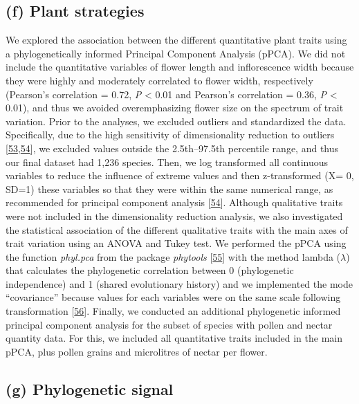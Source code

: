 \documentclass[
  12pt,
  a4paper,
]{article}
\begin{document}
\hypertarget{f-plant-strategies}{%
\subsection{(f) Plant strategies}\label{f-plant-strategies}}

We explored the association between the different quantitative plant traits using a phylogenetically informed Principal Component Analysis (pPCA). We did not include the quantitative variables of flower length and inflorescence width because they were highly and moderately correlated to flower width, respectively (Pearson's correlation = 0.72, \emph{P} \textless{} 0.01 and Pearson's correlation = 0.36, \emph{P} \textless{} 0.01), and thus we avoided overemphasizing flower size on the spectrum of trait variation. Prior to the analyses, we excluded outliers and standardized the data. Specifically, due to the high sensitivity of dimensionality reduction to outliers {[}\protect\hyperlink{ref-serneels2008}{53},\protect\hyperlink{ref-legendre2012}{54}{]}, we excluded values outside the 2.5th--97.5th percentile range, and thus our final dataset had 1,236 species. Then, we log transformed all continuous variables to reduce the influence of extreme values and then z-transformed (X= 0, SD=1) these variables so that they were within the same numerical range, as recommended for principal component analysis {[}\protect\hyperlink{ref-legendre2012}{54}{]}. Although qualitative traits were not included in the dimensionality reduction analysis, we also investigated the statistical association of the different qualitative traits with the main axes of trait variation using an ANOVA and Tukey test. We performed the pPCA using the function \emph{phyl.pca} from the package \emph{phytools} {[}\protect\hyperlink{ref-revell2012}{55}{]} with the method lambda (\(\lambda\)) that calculates the phylogenetic correlation between 0 (phylogenetic independence) and 1 (shared evolutionary history) and we implemented the mode ``covariance'' because values for each variables were on the same scale following transformation {[}\protect\hyperlink{ref-abdi2010}{56}{]}. Finally, we conducted an additional phylogenetic informed principal component analysis for the subset of species with pollen and nectar quantity data. For this, we included all quantitative traits included in the main pPCA, plus pollen grains and microlitres of nectar per flower.

\hypertarget{g-phylogenetic-signal}{%
\subsection{(g) Phylogenetic signal}\label{g-phylogenetic-signal}}
\end{document}
